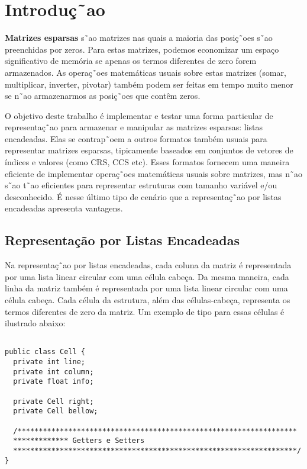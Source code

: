 \section*{Introduç˜ao}

\textbf{Matrizes esparsas} s˜ao matrizes nas quais a maioria das posiç˜oes s˜ao preenchidas por zeros. Para estas matrizes, podemos economizar um espaço significativo de memória se apenas os termos diferentes de zero forem armazenados. As operaç˜oes matemáticas usuais sobre estas matrizes (somar, multiplicar, inverter, pivotar) também podem ser feitas em tempo muito menor se n˜ao armazenarmos as posiç˜oes que contêm zeros.

O objetivo deste trabalho é implementar e testar uma forma particular de representaç˜ao para armazenar e manipular as matrizes esparsas: listas encadeadas. Elas se contrap˜oem a outros formatos também usuais para representar matrizes esparsas, tipicamente baseados em conjuntos de vetores de índices e valores (como CRS, CCS etc). Esses formatos fornecem uma maneira eficiente de implementar operaç˜oes matemáticas usuais sobre matrizes, mas n˜ao s˜ao t˜ao eficientes para representar estruturas com tamanho variável e/ou desconhecido. É nesse último tipo de cenário que a representaç˜ao por listas encadeadas apresenta vantagens.

\subsection*{Representação por Listas Encadeadas}

Na representaç˜ao por listas encadeadas, cada coluna da matriz é representada por uma lista linear circular com uma célula cabeça. Da mesma maneira, cada linha da matriz também é representada por uma lista linear circular com uma célula cabeça. Cada célula da estrutura, além das células-cabeça, representa os termos diferentes de zero da matriz. Um exemplo de tipo para essas células é ilustrado abaixo:

\begin{verbatim}

public class Cell {
  private int line;
  private int column;
  private float info;
  
  private Cell right;
  private Cell bellow;
  
  /******************************************************************
  ************* Getters e Setters
  *******************************************************************/
}

\end{verbatim}

